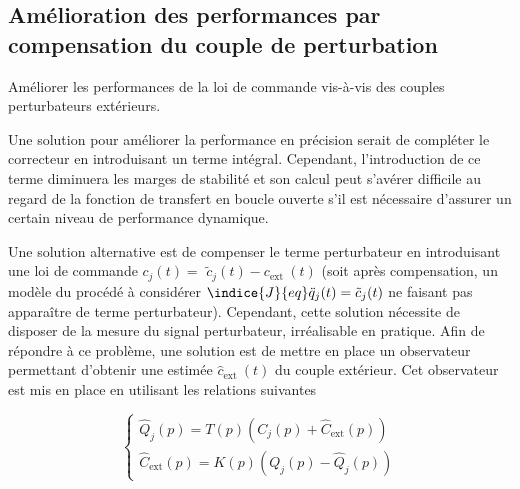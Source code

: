 
\subsection{Amélioration des performances par compensation du couple de perturbation}
\begin{obj}
Améliorer les performances de la loi de commande vis-à-vis des couples perturbateurs extérieurs.
\end{obj}

Une solution pour améliorer la performance en précision serait de compléter le correcteur en introduisant un terme intégral. Cependant, l'introduction de ce terme diminuera les marges de stabilité et son calcul peut s'avérer difficile au regard de la fonction de transfert en boucle ouverte s'il est nécessaire d'assurer un certain niveau de performance dynamique.

Une solution alternative est de compenser le terme perturbateur en introduisant une loi de commande $c_{j}(t)=$ $\tilde{c}_{j}(t)-c_{\text {ext }}(t)$ (soit après compensation, un modèle du procédé à considérer $\indice{J}{eq} \ddot{q}_{j}(t)=\tilde{c}_{j}(t)$ ne faisant pas apparaître de terme perturbateur). Cependant, cette solution nécessite de disposer de la mesure du signal perturbateur, irréalisable en pratique. Afin de répondre à ce problème, une solution est de mettre en place un observateur permettant d'obtenir une estimée $\hat{c}_{\text {ext }}(t)$ du couple extérieur. Cet observateur est mis en place en utilisant les relations suivantes

$$
\left\{\begin{array}{l}
\hat{Q}_{j}(p)=T(p)\left(C_{j}(p)+\hat{C}_{\mathrm{ext}}(p)\right) \\
\hat{C}_{\mathrm{ext}}(p)=K(p)\left(Q_{j}(p)-\hat{Q}_{j}(p)\right)
\end{array}\right.
$$

